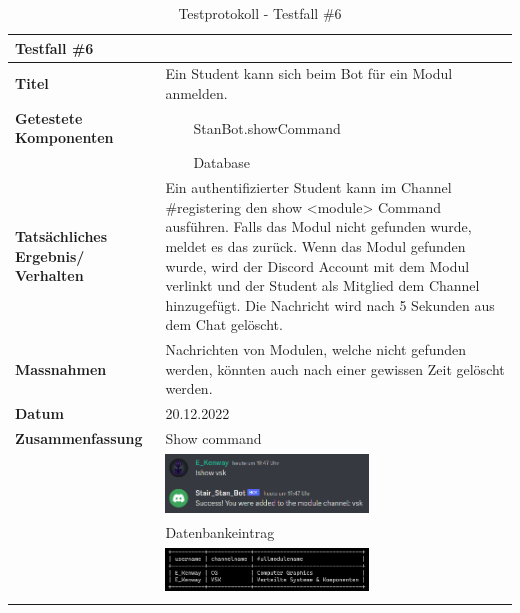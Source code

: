 \documentclass[a4paper, table]{article}
\newcommand{\tabitem}{~~\llap{\textbullet}~~}
\begin{document}
\begin{longtable}[h]{|p{9em}|p{31em}|}
    \hline
    \multicolumn{2}{|l|}{\textbf{Testfall \#6}} \\
    \hline
    \textbf{Titel} & Ein Student kann sich beim Bot für ein Modul anmelden. \\
    \hline
    \textbf{Getestete Komponenten} &  
        \tabitem StanBot.showCommand \\*
     &  \tabitem Database \\
    \hline
    \textbf{Tatsächliches Ergebnis/ Verhalten} & 
        Ein authentifizierter Student kann im Channel \#registering den show <module> Command ausführen.
        Falls das Modul nicht gefunden wurde, meldet es das zurück.
        Wenn das Modul gefunden wurde, wird der Discord Account mit dem Modul verlinkt und der Student als Mitglied dem Channel hinzugefügt. 
        Die Nachricht wird nach 5 Sekunden aus dem Chat gelöscht. \\
    \hline
    \textbf{Massnahmen} & Nachrichten von Modulen, welche nicht gefunden werden, könnten auch nach einer gewissen Zeit gelöscht werden. \\
    \hline
    \textbf{Datum} & 20.12.2022\\
    \hline
    \textbf{Zusammenfassung} & 
        Show command \\*
     &  \includegraphics[width=0.6\textwidth]{img/Tests/6_Test_ShowCommandMessage.png} \\*
     &  Datenbankeintrag \\*
     &  \includegraphics[width=0.6\textwidth]{img/Tests/6_Test_ShowCommandDatabase.png} \\
    \hline
    \caption{Testprotokoll - Testfall \#6}
\end{longtable}
\end{document}
